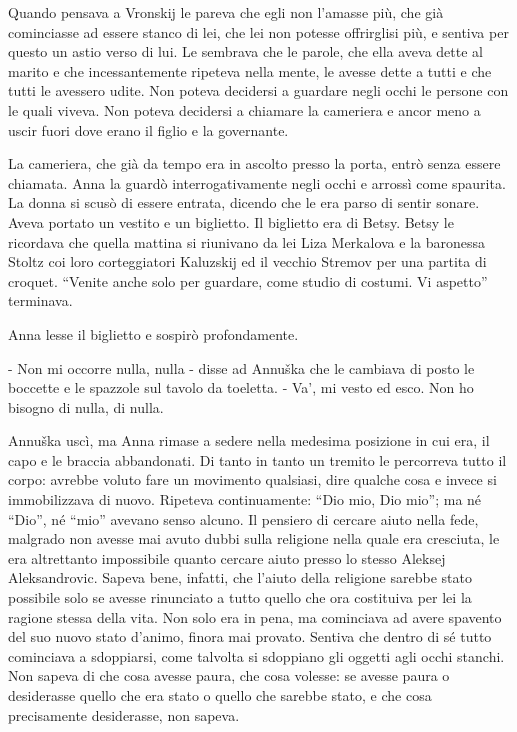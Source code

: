 Quando pensava a Vronskij le pareva che egli non l'amasse più, che già cominciasse ad essere stanco di lei, che lei non potesse offrirglisi più, e sentiva per questo un astio verso di lui. Le sembrava che le parole, che ella aveva dette al marito e che incessantemente ripeteva nella mente, le avesse dette a tutti e che tutti le avessero udite. Non poteva decidersi a guardare negli occhi le persone con le quali viveva. Non poteva decidersi a chiamare la cameriera e ancor meno a uscir fuori dove erano il figlio e la governante. 

La cameriera, che già da tempo era in ascolto presso la porta, entrò senza essere chiamata. Anna la guardò interrogativamente negli occhi e arrossì come spaurita. La donna si scusò di essere entrata, dicendo che le era parso di sentir sonare. Aveva portato un vestito e un biglietto. Il biglietto era di Betsy. Betsy le ricordava che quella mattina si riunivano da lei Liza Merkalova e la baronessa Stoltz coi loro corteggiatori Kaluzskij ed il vecchio Stremov per una partita di croquet. ``Venite anche solo per guardare, come studio di costumi. Vi aspetto'' terminava. 

Anna lesse il biglietto e sospirò profondamente. 

- Non mi occorre nulla, nulla - disse ad Annuška che le cambiava di posto le boccette e le spazzole sul tavolo da toeletta. - Va', mi vesto ed esco. Non ho bisogno di nulla, di nulla. 

Annuška uscì, ma Anna rimase a sedere nella medesima posizione in cui era, il capo e le braccia abbandonati. Di tanto in tanto un tremito le percorreva tutto il corpo: avrebbe voluto fare un movimento qualsiasi, dire qualche cosa e invece si immobilizzava di nuovo. Ripeteva continuamente: ``Dio mio, Dio mio''; ma né ``Dio'', né ``mio'' avevano senso alcuno. Il pensiero di cercare aiuto nella fede, malgrado non avesse mai avuto dubbi sulla religione nella quale era cresciuta, le era altrettanto impossibile quanto cercare aiuto presso lo stesso Aleksej Aleksandrovic. Sapeva bene, infatti, che l'aiuto della religione sarebbe stato possibile solo se avesse rinunciato a tutto quello che ora costituiva per lei la ragione stessa della vita. Non solo era in pena, ma cominciava ad avere spavento del suo nuovo stato d'animo, finora mai provato. Sentiva che dentro di sé tutto cominciava a sdoppiarsi, come talvolta si sdoppiano gli oggetti agli occhi stanchi. Non sapeva di che cosa avesse paura, che cosa volesse: se avesse paura o desiderasse quello che era stato o quello che sarebbe stato, e che cosa precisamente desiderasse, non sapeva. 

